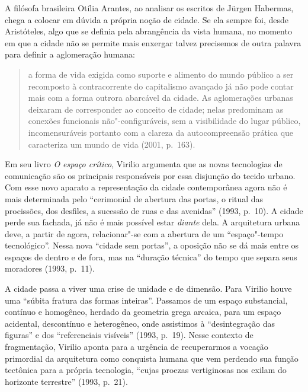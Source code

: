 A filósofa brasileira Otília Arantes, ao analisar os escritos de Jürgen
Habermas, chega a colocar em dúvida a própria noção de cidade. Se ela
sempre foi, desde Aristóteles, algo que se definia pela abrangência da
vista humana, no momento em que a cidade não se permite mais enxergar
talvez precisemos de outra palavra para definir a aglomeração humana:

\begin{quote}
a forma de vida exigida como suporte e alimento do mundo público a ser
recomposto à contracorrente do capitalismo avançado já não pode contar
mais com a forma outrora abarcável da cidade. As aglomerações urbanas
deixaram de corresponder ao conceito de cidade; nelas predominam as
conexões funcionais não"-configuráveis, sem a visibilidade do lugar
público, incomensuráveis portanto com a clareza da autocompreensão
prática que caracteriza um mundo de vida (2001, p.~163).
\end{quote}

Em seu livro \emph{O espaço crítico}, Virilio argumenta que as novas
tecnologias de comunicação são os principais responsáveis por essa
disjunção do tecido urbano. Com esse novo aparato a representação da
cidade contemporânea agora não é mais determinada pelo ``cerimonial de
abertura das portas, o ritual das procissões, dos desfiles, a sucessão
de ruas e das avenidas'' (1993, p.~10). A cidade perde sua fachada, já
não é mais possível estar \emph{diante} dela. A arquitetura urbana deve,
a partir de agora, relacionar"-se com a abertura de um ``espaço"-tempo
tecnológico''. Nessa nova ``cidade sem portas'', a oposição não se dá
mais entre os espaços de dentro e de fora, mas na ``duração técnica'' do
tempo que separa seus moradores (1993, p.~11).

A cidade passa a viver uma crise de unidade e de dimensão. Para Virilio
houve uma ``súbita fratura das formas inteiras''. Passamos de um espaço
substancial, contínuo e homogêneo, herdado da geometria grega arcaica,
para um espaço acidental, descontínuo e heterogêneo, onde assistimos à
``desintegração das figuras'' e dos ``referenciais visíveis'' (1993, p.~19). Nesse contexto de fragmentação, Virilio aponta para a urgência de
recuperarmos a vocação primordial da arquitetura como conquista humana
que vem perdendo sua função tectônica para a própria tecnologia, ``cujas
proezas vertiginosas nos exilam do horizonte terrestre'' (1993, p.~21).

